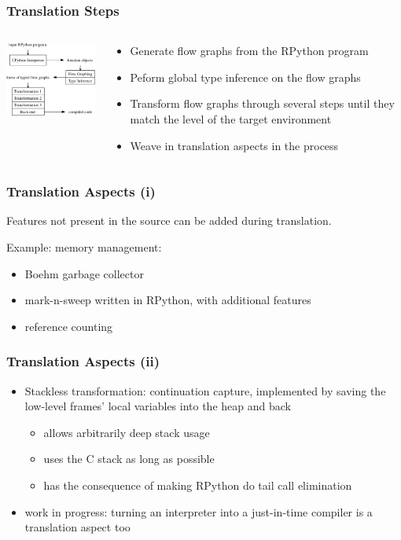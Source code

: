 \documentclass[utf8]{beamer}
\begin{document}
\begin{frame}
  \frametitle{Translation Steps}
  \begin{columns}[c]
  \begin{column}{5cm}
    \includegraphics[width=5cm]{image/arch.pdf}
  \end{column}
  \begin{column}{7cm}
  \begin{itemize}
    \item
      Generate flow graphs from the RPython program
    \item
      Peform global type inference on the flow graphs
    \item
      Transform flow graphs through several steps until they match the level of
      the target environment
    \item
      Weave in translation aspects in the process
  \end{itemize}
  \end{column}
  \end{columns}

\end{frame}


\begin{frame}
  \frametitle{Translation Aspects (i)}
  Features not present in the source can be
  added during translation.

  Example: memory management:
  \begin{itemize}
  \item
  Boehm garbage collector
  \item
  mark-n-sweep written in RPython, with additional features
  \item
  reference counting
  \end{itemize}
\end{frame}


\begin{frame}
  \frametitle{Translation Aspects (ii)}
  \begin{itemize}
  \item
    \alert{Stackless transformation}: continuation capture, implemented by
    saving the low-level frames' local variables into the heap and back
    \begin{itemize}
      \item allows arbitrarily deep stack usage
      \item uses the C stack as long as possible
      \item has the consequence of making RPython do tail call elimination
    \end{itemize}
  \item
    work in progress: turning an interpreter into a just-in-time compiler
    is a translation aspect too
  \end{itemize}
\end{frame}
\end{document}
